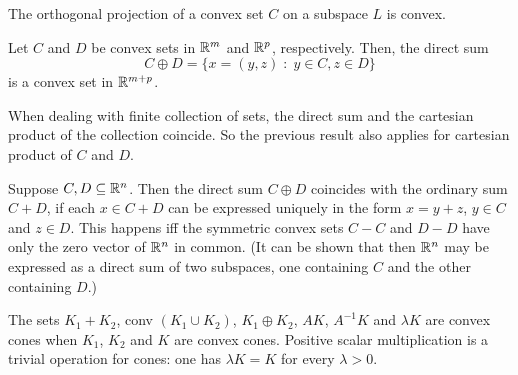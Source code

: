\documentclass[11pt,a4paper]{article}
\begin{document}
\begin{corollary}
    The orthogonal projection of a convex set $C$ on a subspace $L$ is convex.
\end{corollary}


\begin{theorem}\label{thm:direct_sum_convex}
    Let $C$ and $D$ be convex sets in $\mathbb{R}^m$ and $\mathbb{R}^p$, respectively. Then, the direct sum
    \begin{equation*}
        C\oplus D = \{x = (y,z)\;:\; y\in C, z\in D\}
    \end{equation*}
    is a convex set in $\mathbb{R}^{m+p}$.
\end{theorem}

\begin{remark}
    When dealing with finite collection of sets, the direct sum and the cartesian product of the collection coincide. So the previous result also applies for cartesian product of $C$ and $D$.
\end{remark}

\begin{remark}\label{remark:direct_sum_cartesian_product}
    Suppose $C,D\subseteq\mathbb{R}^n$. Then the direct sum $C\oplus D$ coincides with the ordinary sum $C+D$, if each $x\in C+D$ can be expressed uniquely in the form $x = y+z$, $y\in C$ and $z\in D$. This happens iff the symmetric convex sets $C-C$ and $D-D$ have only the zero vector of $\mathbb{R}^n$ in common. (It can be shown that then $\mathbb{R}^n$ may be expressed as a direct sum of two subspaces, one containing $C$ and the other containing $D$.)
\end{remark}


\begin{remark}
    The sets $K_1+K_2$, conv $(K_1\cup K_2)$, $K_1\oplus K_2$, $AK$, $A^{-1}K$ and $\lambda K$ are convex cones when $K_1$, $K_2$ and $K$ are convex cones. Positive scalar multiplication is a trivial operation for cones: one has $\lambda K = K$ for every $\lambda >0$.
\end{remark}
\end{document}
